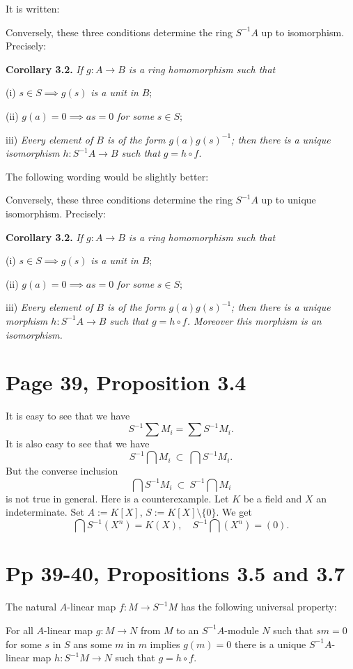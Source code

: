 \documentclass[12pt]{article}
\begin{document}
It is written:

Conversely, these three conditions determine the ring $S^{-1}A$ up to isomorphism. Precisely:

\textbf{Corollary 3.2.} \emph{If $g:A\to B$ is a ring homomorphism such that}

(i) $s\in S\implies g(s)$ \emph{is a unit in} $B$;

(ii) $g(a)=0\implies as=0$ \emph{for some} $s\in S$;

iii) \emph{Every element of $B$ is of the form $g(a)g(s)^{-1}$; then there is a unique isomorphism $h:S^{-1}A\to B$ such that} $g=h\circ f$.

The following wording would be slightly better:

Conversely, these three conditions determine the ring $S^{-1}A$ up to unique isomorphism. Precisely:

\textbf{Corollary 3.2.} \emph{If $g:A\to B$ is a ring homomorphism such that}

(i) $s\in S\implies g(s)$ \emph{is a unit in} $B$;

(ii) $g(a)=0\implies as=0$ \emph{for some} $s\in S$;

iii) \emph{Every element of $B$ is of the form $g(a)g(s)^{-1}$; then there is a unique morphism $h:S^{-1}A\to B$ such that $g=h\circ f$. Moreover this morphism is an isomorphism.}

\section{Page 39, Proposition 3.4}%

It is easy to see that we have 
$$
S^{-1}\sum M_i=\sum S^{-1}M_i.
$$ 
It is also easy to see that we have 
$$
S^{-1}\bigcap M_i\ \subset\ \bigcap S^{-1}M_i.
$$ 
But the converse inclusion 
$$
\bigcap S^{-1}M_i\ \subset\ S^{-1}\bigcap M_i
$$ 
is not true in general. Here is a counterexample. Let $K$ be a field and $X$ an indeterminate. Set $A:=K[X]$, $S:=K[X]\setminus\{0\}$. We get 
$$
\bigcap S^{-1}(X^n)=K(X),\quad S^{-1}\bigcap(X^n)=(0).
$$

\section{Pp 39-40, Propositions 3.5 and 3.7}%

The natural $A$-linear map $f:M\to S^{-1}M$ has the following universal property:

For all $A$-linear map $g:M\to N$ from $M$ to an $S^{-1}A$-module $N$ such that $sm=0$ for some $s$ in $S$ ans some $m$ in $m$ implies $g(m)=0$ there is a unique $S^{-1}A$-linear map $h:S^{-1}M\to N$ such that $g=h\circ f$.
\end{document}
